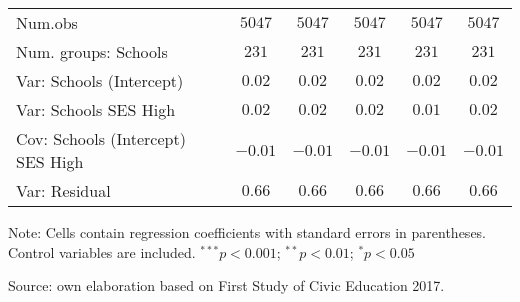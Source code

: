 \documentclass[
  12pt,
  letterpaper,
]{article}
\begin{document}
\begin{table}
{\begin{center}
{\begin{threeparttable}
\begin{tabular}{l c c c c c}
Num.obs                                   & $5047$        & $5047$        & $5047$        & $5047$        & $5047$        \\
Num. groups: Schools                      & $231$         & $231$         & $231$         & $231$         & $231$         \\
Var: Schools (Intercept)                  & $0.02$        & $0.02$        & $0.02$        & $0.02$        & $0.02$        \\
Var: Schools SES High                     & $0.02$        & $0.02$        & $0.02$        & $0.01$        & $0.02$        \\
Cov: Schools (Intercept) SES High         & $-0.01$       & $-0.01$       & $-0.01$       & $-0.01$       & $-0.01$       \\
Var: Residual                             & $0.66$        & $0.66$        & $0.66$        & $0.66$        & $0.66$        \\
\bottomrule
\end{tabular}
\begin{tablenotes}[flushleft]
\scriptsize{\item Note: Cells contain regression coefficients with standard errors in parentheses. Control variables are included. $^{***}p<0.001$; $^{**}p<0.01$; $^{*}p<0.05$ \\ \item Source: own elaboration based on First Study of Civic Education 2017.}
\end{tablenotes}
\end{threeparttable}
}
\caption{}
\label{table:coefficients}
\end{center}

}

\end{table}%
\end{document}
